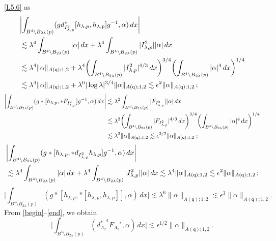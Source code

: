 \documentclass[11pt]{article}
\numberwithin{equation}{section} \setlength{\topmargin}{-35pt}
\newcommand{\q}{\mathsf{q}}
\begin{document}
\ref{L5.6} as
\begin{align}
&\biggl|\int_{B^4\setminus B_{2\lambda}(p)}(gd_{I^2_{\lambda,p}}^{\ast}[h_{\lambda,p},h_{\lambda,p}]g^{-1},\alpha)\,dx\biggr|\notag\\
&\lesssim\lambda^4\int_{B^4\setminus B_{2\lambda}(p)}|\alpha|\,dx+
\lambda^4\int_{B^4\setminus B_{2\lambda}(p)}|I^2_{\lambda,p}||\alpha|\,dx\notag\\
&\lesssim\lambda^4\|\alpha\|_{A(\q);1,2}+\lambda^4\biggl(\int_{B^4\setminus
B_{2\lambda}(p)}|I^2_{\lambda,p}|^{4/3}\,dx\biggr)^{3/4}
\biggl(\int_{B^4\setminus B_{2\lambda}(p)}|\alpha|^4\,dx\biggr)^{1/4}\notag\\
&\lesssim\lambda^4\|\alpha\|_{A(\q);1,2}+\lambda^6|\log\lambda|^{3/4}\|\alpha\|_{A(\q);1,2}\lesssim\epsilon^2\|\alpha\|_{A(\q);1,2}\,;
\end{align}
\begin{align}
\biggl|\int_{B^4\setminus B_{2\lambda}(p)}(g\ast[h_{\lambda,p},\ast
F_{I^2_{\lambda,p}}]g^{-1},\alpha)\,dx\biggr|
&\lesssim\lambda^2\int_{B^4\setminus B_{2\lambda}(p)}|F_{I^2_{\lambda,p}}||\alpha|\,dx\notag\\
&\lesssim\lambda^2\biggl(\int_{B^4\setminus
B_{2\lambda}(p)}|F_{I^2_{\lambda,p}}|^{4/3}\,dx\biggr)^{3/4}
\biggl(\int_{B^4\setminus B_{2\lambda}(p)}|\alpha|^4\,dx\biggr)^{1/4}\notag\\
&\lesssim\lambda^3\|\alpha\|_{A(\q);1,2}\lesssim\epsilon^{3/2}\|\alpha\|_{A(\q);1,2}\;;
\end{align}
\begin{align}
&\biggl|\int_{B^4\setminus B_{2\lambda}(p)}(g\ast[h_{\lambda,p},\ast
d_{I^2_{\lambda,p}}h_{\lambda,p}]g^{-1},\alpha)\,dx
\biggr|\notag\\
&\lesssim\lambda^4\int_{B^4\setminus B_{2\lambda}(p)}|\alpha|\,dx+
\lambda^4\int_{B^4\setminus
B_{2\lambda}(p)}|I^2_{\lambda,p}||\alpha|\,dx\lesssim\lambda^4\|\alpha\|_{A(\q);1,2}\lesssim\epsilon^2\|\alpha\|_{A(\q);1,2}\,;
\end{align}
\begin{equation}
\label{end}
 \biggl|\int_{B^4\setminus
B_{2\lambda}(p)}(g\ast[h_{\lambda,p},\ast[h_{\lambda,p},h_{\lambda,p}]],\alpha)\,dx
\biggr|\lesssim\lambda^6\|\alpha\|_{A(\q);1,2}\lesssim\epsilon^3\|\alpha\|_{A(\q);1,2}.
\end{equation}
From \eqref{begin}--\eqref{end}, we obtain
\begin{equation}
\label{begin2} \biggl|\int_{B^4\setminus
B_{2\lambda}(p)}({d_{A_2}^{\ast}}^{\epsilon}{F_{A_2}}^{\epsilon},\alpha)\,dx
\biggr|\lesssim\epsilon^{1/2}\|\alpha\|_{A(\q);1,2}.
\end{equation}
\end{document}
